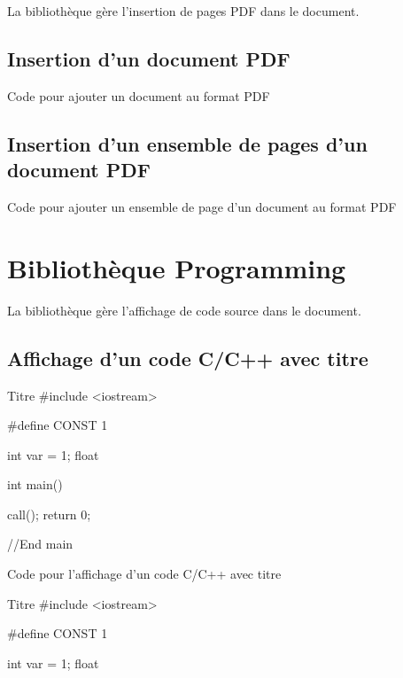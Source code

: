 {La bibliothèque  gère l'insertion de pages PDF dans le document.

\section{Insertion d'un document PDF}

\begin{Latex}{Code pour ajouter un document au format PDF}

\end{Latex}

\section{Insertion d'un ensemble de pages d'un document PDF}

\begin{Latex}{Code pour ajouter un ensemble de page d'un document au format PDF}

\end{Latex}

\chapter{Bibliothèque Programming}

La bibliothèque  gère l'affichage de code source dans le document.\\

\section{Affichage d'un code C/C++ avec titre}


\begin{Cpp}{Titre}
#include <iostream>

#define CONST 1

int var = 1;
float 

int main() {
  
  call();
  return 0;

}//End main

\end{Cpp}

\begin{Latex}{Code pour l'affichage d'un code C/C++ avec titre}
    \begin{Cpp}{Titre}
        #include <iostream>
        
        #define CONST 1
        
        int var = 1;
        float 
        

\end{Cpp}
\end{Latex}}
